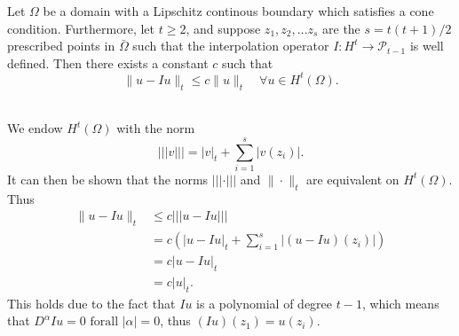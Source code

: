 
\begin{lem}{\quad}
Let $\Omega$ be a domain with a Lipschitz continous boundary which satisfies a cone condition. Furthermore, let $t\geq 2$, and suppose $z_1,z_2,\ldots z_s$ are the
$s = t(t+1)/2$ prescribed points in $\bar{\Omega}$ such that the interpolation operator $I:H^t \rightarrow \mathcal{P}_{t-1}$ is well defined.
Then there exists a constant $c$ such that
\begin{equation}
    \|u-Iu\|_t\leq c\|u\|_t\quad \forall u\in H^t(\Omega).
    \label{eq:lem_6.2}
\end{equation}~\label{lem:6.2}
\end{lem}

\begin{bev}
    We endow $H^t(\Omega)$ with the norm 
    \begin{equation*}
        |||v||| = |v|_t + \sum_{i=1}^s |v(z_i)|.
    \end{equation*}
It can then be shown that the norms $|||\cdot|||$ and $\|\cdot\|_t$ are equivalent on $H^t(\Omega)$. Thus
\begin{align*}
    \|u-Iu\|_t&\leq c|||u-Iu|||\\
    &= c(|u-Iu|_t + \sum_{i=1}^s|(u-Iu)(z_i)|)\\
    &= c|u-Iu|_t \\
    &= c|u|_t.
\end{align*}
This holds due to the fact that $Iu$ is a polynomial of degree $t-1$, which means that $D^{\alpha} Iu = 0 \text{ forall } |\alpha|=0$, thus $(Iu)(z_1)=u(z_i)$.


\end{bev}
